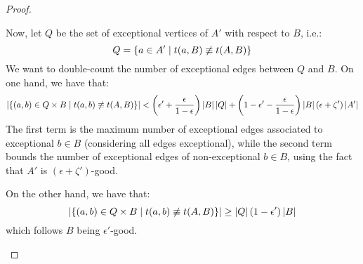 \begin{proof}
\begin{enumerate}[label=(\alph*), ref=\alph*]
                Now, let $Q$ be the set of exceptional vertices of $A'$ with respect to $B$, i.e.:
                $$
                    Q = \left\{ a \in A' \mid t(a, B) \not\equiv t(A, B) \right\}
                $$
                We want to double-count the number of exceptional edges between $Q$ and $B$.
                On one hand, we have that:
                $$
                    \left| \left\{ (a,b) \in Q \times B \mid t(a, b) \not\equiv t(A, B) \right\} \right| < 
                    \left( \epsilon' + \frac{\epsilon}{1 - \epsilon} \right) \left| B \right| \left| Q \right| + 
                    \left( 1 - \epsilon' - \frac{\epsilon}{1 - \epsilon} \right) \left| B \right| \left( \epsilon + \zeta' \right) \left| A' \right|
                $$
                The first term is the maximum number of exceptional edges associated to exceptional $b \in B$ 
                (considering all edges exceptional), while the second term bounds the number of exceptional edges of 
                non-exceptional $b \in B$, using the fact that $A'$ is $(\epsilon + \zeta')$-good.
            
                On the other hand, we have that:
                $$
                    \left| \left\{ (a,b) \in Q \times B \mid t(a, b) \not\equiv t(A, B) \right\} \right| \geq
                    \left| Q \right| \left( 1 - \epsilon' \right) \left| B \right|
                $$
                which follows $B$ being $\epsilon'$-good.


\end{enumerate}
\end{proof}
